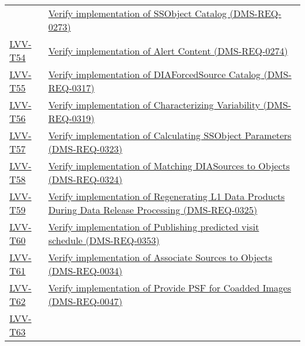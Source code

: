 \begin{longtable}[]{@{}ll@{}}
&
\href{https://jira.lsstcorp.org/secure/Tests.jspa\#/testCase/LVV-T53}{Verify
implementation of SSObject Catalog (DMS-REQ-0273)}\tabularnewline
\protect\hyperlink{lvv-t54---verify-implementation-of-alert-content-dms-req-0274}{LVV-T54}
&
\href{https://jira.lsstcorp.org/secure/Tests.jspa\#/testCase/LVV-T54}{Verify
implementation of Alert Content (DMS-REQ-0274)}\tabularnewline
\protect\hyperlink{lvv-t55---verify-implementation-of-diaforcedsource-catalog-dms-req-0317}{LVV-T55}
&
\href{https://jira.lsstcorp.org/secure/Tests.jspa\#/testCase/LVV-T55}{Verify
implementation of DIAForcedSource Catalog (DMS-REQ-0317)}\tabularnewline
\protect\hyperlink{lvv-t56---verify-implementation-of-characterizing-variability-dms-req-0319}{LVV-T56}
&
\href{https://jira.lsstcorp.org/secure/Tests.jspa\#/testCase/LVV-T56}{Verify
implementation of Characterizing Variability
(DMS-REQ-0319)}\tabularnewline
\protect\hyperlink{lvv-t57---verify-implementation-of-calculating-ssobject-parameters-dms-req-0323}{LVV-T57}
&
\href{https://jira.lsstcorp.org/secure/Tests.jspa\#/testCase/LVV-T57}{Verify
implementation of Calculating SSObject Parameters
(DMS-REQ-0323)}\tabularnewline
\protect\hyperlink{lvv-t58---verify-implementation-of-matching-diasources-to-objects-dms-req-0324}{LVV-T58}
&
\href{https://jira.lsstcorp.org/secure/Tests.jspa\#/testCase/LVV-T58}{Verify
implementation of Matching DIASources to Objects
(DMS-REQ-0324)}\tabularnewline
\protect\hyperlink{lvv-t59---verify-implementation-of-regenerating-l1-data-products-during-data-release-processing-dms-req-0325}{LVV-T59}
&
\href{https://jira.lsstcorp.org/secure/Tests.jspa\#/testCase/LVV-T59}{Verify
implementation of Regenerating L1 Data Products During Data Release
Processing (DMS-REQ-0325)}\tabularnewline
\protect\hyperlink{lvv-t60---verify-implementation-of-publishing-predicted-visit-schedule-dms-req-0353}{LVV-T60}
&
\href{https://jira.lsstcorp.org/secure/Tests.jspa\#/testCase/LVV-T60}{Verify
implementation of Publishing predicted visit schedule
(DMS-REQ-0353)}\tabularnewline
\protect\hyperlink{lvv-t61---verify-implementation-of-associate-sources-to-objects--dms-req-0034}{LVV-T61}
&
\href{https://jira.lsstcorp.org/secure/Tests.jspa\#/testCase/LVV-T61}{Verify
implementation of Associate Sources to Objects
(DMS-REQ-0034)}\tabularnewline
\protect\hyperlink{lvv-t62---verify-implementation-of-provide-psf-for-coadded-images-dms-req-0047}{LVV-T62}
&
\href{https://jira.lsstcorp.org/secure/Tests.jspa\#/testCase/LVV-T62}{Verify
implementation of Provide PSF for Coadded Images
(DMS-REQ-0047)}\tabularnewline
\protect\hyperlink{lvv-t63---verify-implementation-of-produce-images-for-epo-dms-req-0103}{LVV-T63}

\end{longtable}
